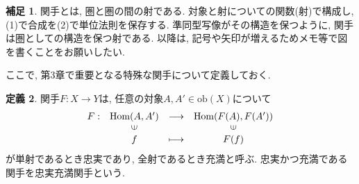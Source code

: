 \documentclass[a4paper]{jsarticle}
\theoremstyle{definition}
\newtheorem{dfn}{定義}[section]
\newtheorem{hsk}[dfn]{補足}
\newcommand{\Hom}{{\mathrm{Hom}}}
\newcommand{\ob}{{\mathrm{ob}}}
\begin{document}
\begin{hsk}
    関手とは, 圏と圏の間の射である. 対象と射についての関数(射)で構成し, (1)で合成を(2)で単位法則を保存する. 準同型写像がその構造を保つように, 関手は圏としての構造を保つ射である. 以降は, 記号や矢印が増えるためメモ等で図を書くことをお願いしたい.\\
\end{hsk}

ここで, 第3章で重要となる特殊な関手について定義しておく.
\begin{dfn}
    関手$F:X\rightarrow Y$は, 任意の対象$A, A'\in \ob(X)$について
\begin{equation}
    \begin{array}{cccc}
         F:& \Hom(A, A') & \longrightarrow & \Hom(F(A), F(A')) \\
        & \rotatebox{90}{$\in$} & & \rotatebox{90}{$\in$} \\
        & f & \longmapsto & F(f)\notag
    \end{array}
\end{equation}
が単射であるとき忠実であり, 全射であるとき充満と呼ぶ. 忠実かつ充満である関手を忠実充満関手という.\\
\end{dfn}
\end{document}
